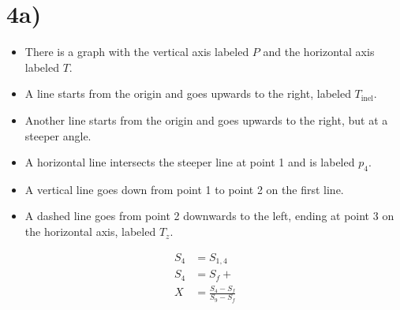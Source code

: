 

\section*{4a)}

\begin{itemize}
    \item There is a graph with the vertical axis labeled \( P \) and the horizontal axis labeled \( T \).
    \item A line starts from the origin and goes upwards to the right, labeled \( T_{\text{inel}} \).
    \item Another line starts from the origin and goes upwards to the right, but at a steeper angle.
    \item A horizontal line intersects the steeper line at point 1 and is labeled \( p_4 \).
    \item A vertical line goes down from point 1 to point 2 on the first line.
    \item A dashed line goes from point 2 downwards to the left, ending at point 3 on the horizontal axis, labeled \( T_z \).
\end{itemize}



\item[(a)] 
    \begin{align*}
        S_4 &= S_{1,4} \\
        S_4 &= S_f + \\
        X &= \frac{S_4 - S_f}{S_9 - S_f}
    \end{align*}